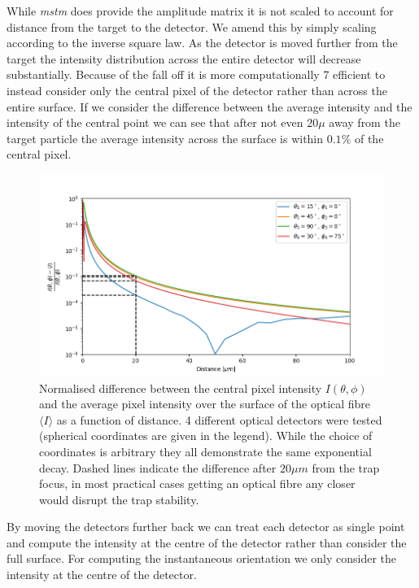 While \textit{mstm} does provide the amplitude matrix it is not
scaled to account for distance from the target to the detector.
We amend this by simply scaling according to the inverse square 
law. As the detector is moved further from the target the 
intensity distribution across the entire detector will decrease
substantially. Because of the fall off it is more computationally 7
efficient to instead consider only the central pixel of the 
detector rather than across the entire surface. If we consider 
the difference between the average intensity and the intensity 
of the central point we can see that after not even $20 \mu$ 
away from the target particle the average intensity across the 
surface is within $0.1\%$ of the central pixel. 
\begin{figure}[h!]
	\centering
	\includegraphics[width=\linewidth]{fall_off_with_distance.png}
	\caption{Normalised difference between the central pixel intensity
	$I(\theta, \phi)$ and the average pixel intensity over the surface
	of the optical fibre $\langle I \rangle$ as a function of distance.
	4 different optical detectors were tested (spherical coordinates 
	are given in the legend). While the choice of coordinates is 
	arbitrary they all demonstrate the same exponential decay. Dashed
	lines indicate the difference after $20\mu m$ from the trap focus,
	in most practical cases getting an optical fibre any closer would
	disrupt the trap stability.}
\end{figure}

By moving the detectors further back we can treat each detector 
as single point and compute the intensity at the centre of the 
detector rather than consider the full surface. For computing 
the instantaneous orientation we only consider the intensity 
at the centre of the detector.

